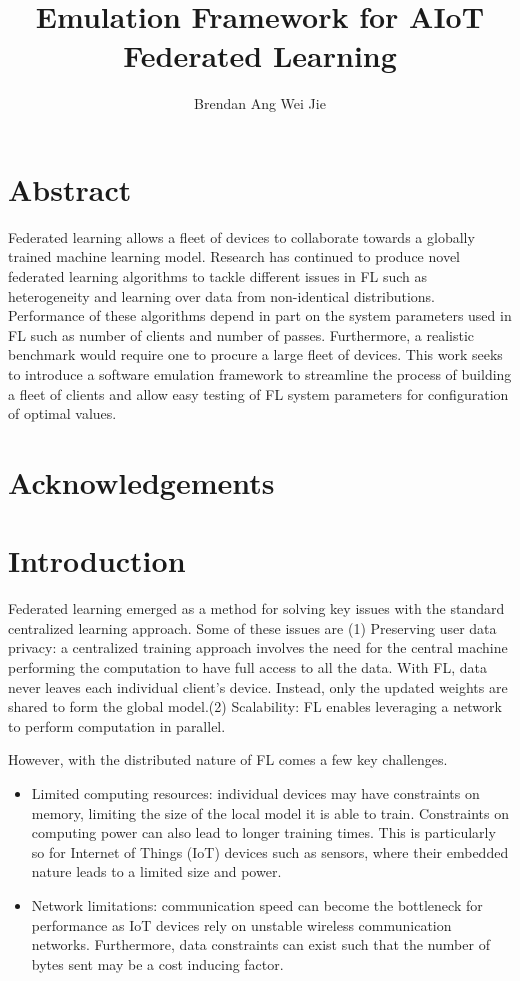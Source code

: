 \documentclass[12pt]{article}
\title{Emulation Framework for AIoT Federated Learning}
\author{Brendan Ang Wei Jie}
\begin{document}
\maketitle

\pagebreak
\section{Abstract}
Federated learning allows a fleet of devices to collaborate towards a globally trained machine
learning model. Research has continued to produce novel federated learning algorithms to tackle
different issues in FL such as heterogeneity and learning over data from non-identical
distributions. Performance of these algorithms depend in part on the system parameters used in FL
such as number of clients and number of passes. Furthermore, a realistic benchmark would require
one to procure a large fleet of devices. This work seeks to introduce a software emulation framework to
streamline the process of building a fleet of clients and allow easy testing of FL system
parameters for configuration of optimal values.
\pagebreak
  \section{Acknowledgements}
\pagebreak
\tableofcontents
\pagebreak
\section{Introduction}
Federated learning emerged as a method for solving key issues with the standard centralized learning
approach. Some of these issues are (1) Preserving user data privacy: a centralized training approach involves the need for the central
machine performing the computation to have full access to all the data. With FL, data never
leaves each individual client's device. Instead, only the updated weights are shared to form the
global model.(2) Scalability: FL enables leveraging a network to perform computation in parallel.

However, with the distributed nature of FL comes a few key challenges.
\begin{itemize}
  \item Limited computing resources: individual devices may have constraints on memory, limiting the
    size of the local model it is able to train. Constraints on computing power can also lead to
    longer training times. This is particularly so for Internet of Things (IoT) devices such as
    sensors, where their embedded nature leads to a limited size and power.
  \item Network limitations: communication speed can become the bottleneck for performance as IoT
    devices rely on unstable wireless communication networks. Furthermore, data constraints can
    exist such that the number of bytes sent may be a cost inducing factor.
\end{itemize}
\end{document}
